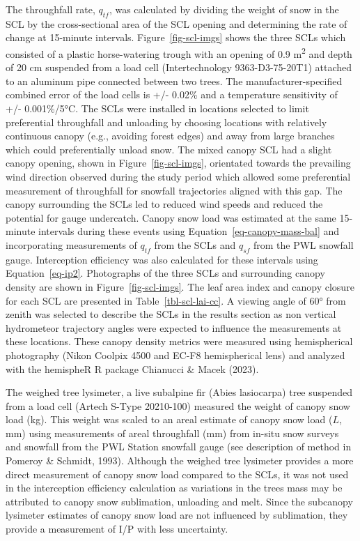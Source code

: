 \documentclass[
  letterpaper,
  DIV=11,
  numbers=noendperiod]{scrartcl}
\begin{document}
The throughfall rate, \(q_{tf}\), was calculated by dividing the weight
of snow in the SCL by the cross-sectional area of the SCL opening and
determining the rate of change at 15-minute intervals.
Figure~\ref{fig-scl-imgs} shows the three SCLs which consisted of a
plastic horse-watering trough with an opening of 0.9
m\textsuperscript{2} and depth of 20 cm suspended from a load cell
(Intertechnology 9363-D3-75-20T1) attached to an aluminum pipe connected
between two trees. The manufacturer-specified combined error of the load
cells is +/- 0.02\% and a temperature sensitivity of +/- 0.001\%/5°C.
The SCLs were installed in locations selected to limit preferential
throughfall and unloading by choosing locations with relatively
continuous canopy (e.g., avoiding forest edges) and away from large
branches which could preferentially unload snow. The mixed canopy SCL
had a slight canopy opening, shown in Figure~\ref{fig-scl-imgs},
orientated towards the prevailing wind direction observed during the
study period which allowed some preferential measurement of throughfall
for snowfall trajectories aligned with this gap. The canopy surrounding
the SCLs led to reduced wind speeds and reduced the potential for gauge
undercatch. Canopy snow load was estimated at the same 15-minute
intervals during these events using Equation~\ref{eq-canopy-mass-bal}
and incorporating measurements of \(q_{tf}\) from the SCLs and
\(q_{sf}\) from the PWL snowfall gauge. Interception efficiency was also
calculated for these intervals using Equation~\ref{eq-ip2}. Photographs
of the three SCLs and surrounding canopy density are shown in
Figure~\ref{fig-scl-imgs}. The leaf area index and canopy closure for
each SCL are presented in Table~\ref{tbl-scl-lai-cc}. A viewing angle of
60° from zenith was selected to describe the SCLs in the results section
as non vertical hydrometeor trajectory angles were expected to influence
the measurements at these locations. These canopy density metrics were
measured using hemispherical photography (Nikon Coolpix 4500 and EC-F8
hemispherical lens) and analyzed with the hemispheR R package Chianucci
\& Macek (2023).

The weighed tree lysimeter, a live subalpine fir (Abies lasiocarpa) tree
suspended from a load cell (Artech S-Type 20210-100) measured the weight
of canopy snow load (kg). This weight was scaled to an areal estimate of
canopy snow load (\(L\), mm) using measurements of areal throughfall
(mm) from in-situ snow surveys and snowfall from the PWL Station
snowfall gauge (see description of method in Pomeroy \& Schmidt, 1993).
Although the weighed tree lysimeter provides a more direct measurement
of canopy snow load compared to the SCLs, it was not used in the
interception efficiency calculation as variations in the trees mass may
be attributed to canopy snow sublimation, unloading and melt. Since the
subcanopy lysimeter estimates of canopy snow load are not influenced by
sublimation, they provide a measurement of I/P with less uncertainty.
\end{document}
